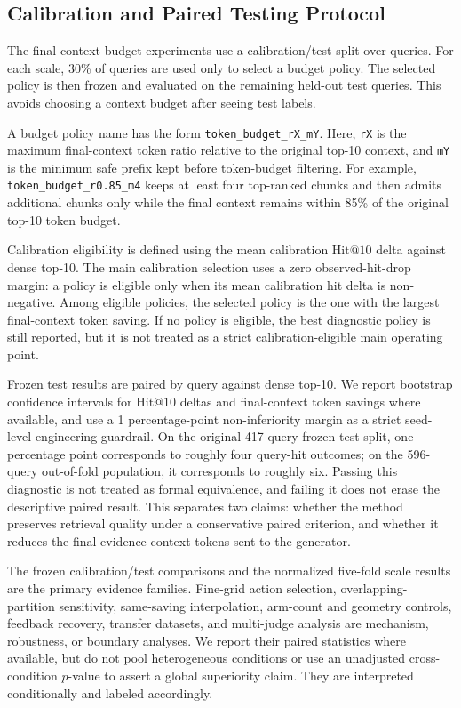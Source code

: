 \subsection{Calibration and Paired Testing Protocol}
\label{sec:05-experimental-setup:calibration-and-paired-testing-protocol}

The final-context budget experiments use a calibration/test split over queries. For each scale, 30\% of queries are used only to select a budget policy. The selected policy is then frozen and evaluated on the remaining held-out test queries. This avoids choosing a context budget after seeing test labels.

A budget policy name has the form \nolinkurl{token_budget_rX_mY}. Here, \nolinkurl{rX} is the maximum final-context token ratio relative to the original top-10 context, and \nolinkurl{mY} is the minimum safe prefix kept before token-budget filtering. For example, \nolinkurl{token_budget_r0.85_m4} keeps at least four top-ranked chunks and then admits additional chunks only while the final context remains within 85\% of the original top-10 token budget.

Calibration eligibility is defined using the mean calibration $\mathrm{Hit@10}$ delta against dense top-10. The main calibration selection uses a zero observed-hit-drop margin: a policy is eligible only when its mean calibration hit delta is non-negative. Among eligible policies, the selected policy is the one with the largest final-context token saving. If no policy is eligible, the best diagnostic policy is still reported, but it is not treated as a strict calibration-eligible main operating point.

Frozen test results are paired by query against dense top-10. We report bootstrap confidence intervals for $\mathrm{Hit@10}$ deltas and final-context token savings where available, and use a 1 percentage-point non-inferiority margin as a strict seed-level engineering guardrail. On the original 417-query frozen test split, one percentage point corresponds to roughly four query-hit outcomes; on the 596-query out-of-fold population, it corresponds to roughly six. Passing this diagnostic is not treated as formal equivalence, and failing it does not erase the descriptive paired result. This separates two claims: whether the method preserves retrieval quality under a conservative paired criterion, and whether it reduces the final evidence-context tokens sent to the generator.

The frozen calibration/test comparisons and the normalized five-fold scale results are the primary evidence families. Fine-grid action selection, overlapping-partition sensitivity, same-saving interpolation, arm-count and geometry controls, feedback recovery, transfer datasets, and multi-judge analysis are mechanism, robustness, or boundary analyses. We report their paired statistics where available, but do not pool heterogeneous conditions or use an unadjusted cross-condition $p$-value to assert a global superiority claim. They are interpreted conditionally and labeled accordingly.

